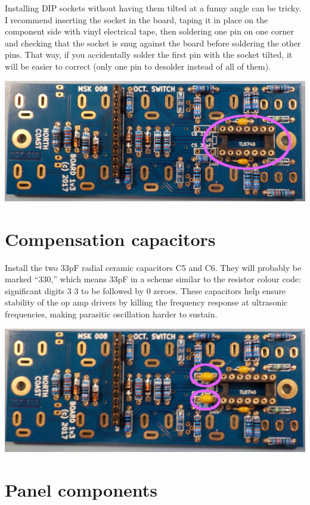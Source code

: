 Installing DIP sockets without having them tilted at a funny angle can be
tricky.  I recommend inserting the socket in the board, taping it in place
on the component side with vinyl electrical tape, then soldering one pin on
one corner and checking that the socket is snug against the board before
soldering the other pins.  That way, if you accidentally solder the first
pin with the socket tilted, it will be easier to correct (only one pin to
desolder instead of all of them).

\noindent\includegraphics[width=\linewidth]{dip1.jpg}

\section{Compensation capacitors}

Install the two 33pF radial ceramic capacitors C5 and C6.  They will
probably be marked ``330,'' which means 33pF in a scheme similar to the
resistor colour code:  significant digits 3 3 to be followed by 0 zeroes. 
These capacitors help ensure stability of the op amp drivers by killing the
frequency response at ultrasonic frequencies, making parasitic oscillation
harder to sustain.

\noindent\includegraphics[width=\linewidth]{cap-33p.jpg}

\section{Panel components}


